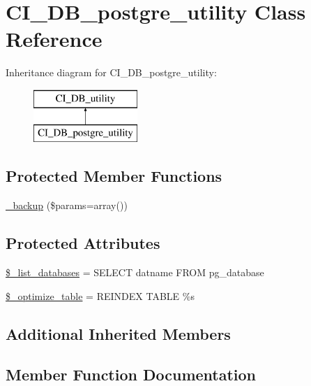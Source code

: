 \hypertarget{class_c_i___d_b__postgre__utility}{}\section{C\+I\+\_\+\+D\+B\+\_\+postgre\+\_\+utility Class Reference}
\label{class_c_i___d_b__postgre__utility}
Inheritance diagram for C\+I\+\_\+\+D\+B\+\_\+postgre\+\_\+utility\+:\begin{figure}[H]
\begin{center}
\leavevmode
\includegraphics[height=2.000000cm]{class_c_i___d_b__postgre__utility}
\end{center}
\end{figure}
\subsection*{Protected Member Functions}
\begin{DoxyCompactItemize}
\item 
\mbox{\hyperlink{class_c_i___d_b__postgre__utility_a30f3053d2c82e7562349924363507afa}{\+\_\+backup}} (\$params=array())
\end{DoxyCompactItemize}
\subsection*{Protected Attributes}
\begin{DoxyCompactItemize}
\item 
\mbox{\hyperlink{class_c_i___d_b__postgre__utility_afe3a5b80562d93d6bc7e2b53c95b7e5a}{\$\+\_\+list\+\_\+databases}} = \textquotesingle{}S\+E\+L\+E\+CT datname F\+R\+OM pg\+\_\+database\textquotesingle{}
\item 
\mbox{\hyperlink{class_c_i___d_b__postgre__utility_a083199e5c22c78912dae0a47bb2d7fad}{\$\+\_\+optimize\+\_\+table}} = \textquotesingle{}R\+E\+I\+N\+D\+EX T\+A\+B\+LE \%s\textquotesingle{}
\end{DoxyCompactItemize}
\subsection*{Additional Inherited Members}


\subsection{Member Function Documentation}
\mbox{\label{class_c_i___d_b__postgre__utility_a30f3053d2c82e7562349924363507afa}} 
